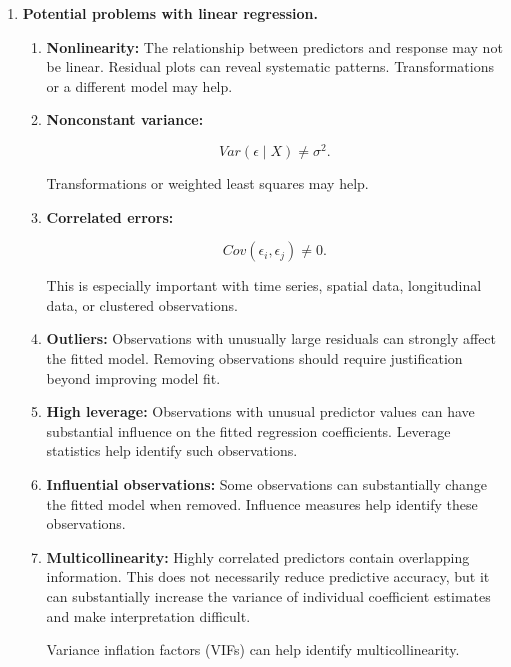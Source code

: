 \documentclass{article}
\begin{document}
\begin{enumerate}
\begin{enumerate}
$$
Y=\beta_0+\beta_1X+\beta_2X^2+\epsilon.
$$

Although the relationship between $Y$ and $X$ is nonlinear, the model is still linear in the unknown coefficients $\beta_j$.
\end{enumerate}

\item \textbf{Potential problems with linear regression.}
\begin{enumerate}

\item \textbf{Nonlinearity:}
The relationship between predictors and response may not be linear. Residual plots can reveal systematic patterns. Transformations or a different model may help.

\item \textbf{Nonconstant variance:}

$$
Var(\epsilon\mid X)\neq\sigma^2.
$$

Transformations or weighted least squares may help.

\item \textbf{Correlated errors:}

$$
Cov(\epsilon_i,\epsilon_j)\neq0.
$$

This is especially important with time series, spatial data, longitudinal data, or clustered observations.

\item \textbf{Outliers:}
Observations with unusually large residuals can strongly affect the fitted model. Removing observations should require justification beyond improving model fit.

\item \textbf{High leverage:}
Observations with unusual predictor values can have substantial influence on the fitted regression coefficients. Leverage statistics help identify such observations.

\item \textbf{Influential observations:}
Some observations can substantially change the fitted model when removed. Influence measures help identify these observations.

\item \textbf{Multicollinearity:}
Highly correlated predictors contain overlapping information. This does not necessarily reduce predictive accuracy, but it can substantially increase the variance of individual coefficient estimates and make interpretation difficult.

Variance inflation factors (VIFs) can help identify multicollinearity.


\end{enumerate}
\end{enumerate}
\end{document}
